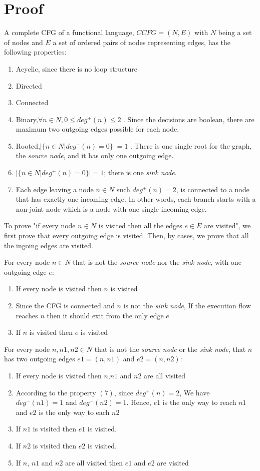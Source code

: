 \section{Proof}
A complete CFG of a functional language, $CCFG = (N,E)$ with $N$ being a set of nodes and $E$ a set of ordered pairs of nodes representing edges, has the following properties:

\begin{enumerate}
 \item Acyclic, since there is no loop structure
 \item Directed
 \item Connected
 \item Binary,$\forall n \in N, 0\leq deg^+(n)\leq2 $ . Since the decisions are boolean, there are maximum two outgoing edges possible for each node.
 \item Rooted,$|\{n\in N |deg^-(n)=0\} | = 1$ . There is one single root for the graph, the \emph{source node}, and it has only one outgoing edge.
 \item $|\{n\in N |deg^+(n)=0\} | = 1$; there is one \emph{sink node}.
 \item Each edge leaving a node $n \in N$ such $deg^+(n)=2$, is connected to a node that has exactly one incoming edge. In other words, each branch starts with a non-joint node which is a node with one single incoming edge.
\end{enumerate}

To prove "if every node $n \in N$ is visited then all the edges $e \in E$ are visited", we first prove that every outgoing edge is visited. Then, by cases, we prove that all the ingoing edges are visited.

For every node $n \in N$ that is not the \emph{source node} nor the \emph{sink node}, with one outgoing edge $e$:
\begin{enumerate}
 \item If every node is visited then $n$ is visited 
 \item Since the CFG is connected and $n$ is not the \emph{sink node}, If the execution flow reaches $n$ then it should exit from the only edge $e$
 \item If $n$ is visited then $e$ is visited
\end{enumerate}

For every node $n,n1,n2 \in N$ that is not the \emph{source node} or the \emph{sink node}, that $n$ has two outgoing edges $e1=(n,n1)$ and $e2=(n,n2)$:
\begin{enumerate}
 \item If every node is visited then $n$,$n1$ and $n2$ are all visited 
 \item According to the property $(7)$, since $deg^+(n)=2$, We have $deg^-(n1)=1$ and $deg^-(n2)=1$. Hence, $e1$ is the only way to reach $n1$ and $e2$ is the only way to each $n2$
 \item If $n1$ is visited then $e1$ is visited.
 \item If $n2$ is visited then $e2$ is visited.
 \item If $n$, $n1$ and $n2$ are all visited then $e1$ and $e2$ are visited
\end{enumerate}

